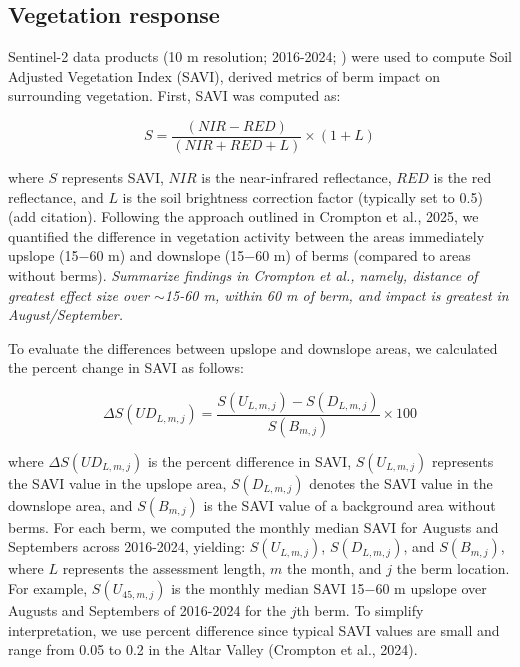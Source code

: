\documentclass[review]{elsarticle}
\begin{document}
\subsection{Vegetation response}


Sentinel-2 data products (10 m resolution; 2016-2024; \cite{drusch2012sentinel}) were used to compute Soil Adjusted Vegetation Index (SAVI), derived metrics of berm impact on surrounding vegetation. First, SAVI was computed as:

\begin{equation}
 S = \frac{(NIR - RED)}{(NIR + RED + L)} \times (1 + L)
\end{equation}

\noindent where $S$ represents SAVI, $NIR$ is the near-infrared reflectance, $RED$ is the red reflectance, and $L$ is the soil brightness correction factor (typically set to 0.5) (add citation). 
Following the approach outlined in Crompton et al., 2025, we quantified the difference in vegetation activity between the areas immediately upslope (15$-$60 m) and downslope (15$-$60 m) of berms (compared to areas without berms). 
\textit{Summarize findings in Crompton et al., namely, distance of greatest effect size over $\sim$15-60 m, within 60 m of berm, and impact is greatest in August/September.}

To evaluate the differences between upslope and downslope areas, we calculated the percent change in SAVI as follows:

\begin{equation}
\Delta S(U\!D_{L,m,j}) = \frac{S(U_{L,m,j}) - S(D_{L,m,j})}{S(B_{m,j})} \times 100
\end{equation}

\noindent where \(\Delta S(U\!D_{L,m,j})\) is the percent difference in SAVI, \(S(U_{L,m,j})\) represents the SAVI value in the upslope area, \(S(D_{L,m,j})\) denotes the SAVI value in the downslope area, and \(S(B_{m,j})\) is the SAVI value of a background area without berms. For each berm, we computed the monthly median SAVI for Augusts and Septembers across 2016-2024, yielding: $S(U_{L, m, j})$, $S(D_{L, m, j})$, and $S(B_{m,j})$, where $L$ represents the assessment length, $m$ the month, and $j$ the berm location. For example, $S(U_{45, m, j})$ is the monthly median SAVI 15$-$60 m upslope over Augusts and Septembers of 2016-2024 for the $j$th berm. To simplify interpretation, we use percent difference since typical SAVI values are small and range from 0.05 to 0.2 in the Altar Valley (Crompton et al., 2024). 
\end{document}
